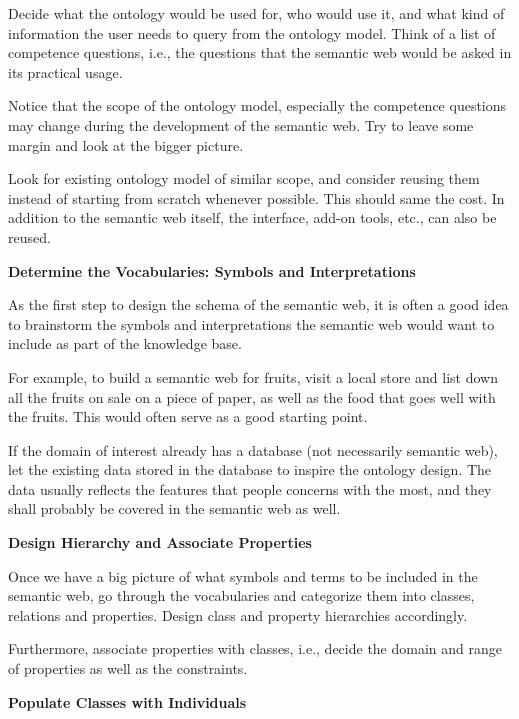 Decide what the ontology would be used for, who would use it, and what kind of information the user needs to query from the ontology model. Think of a list of competence questions, i.e., the questions that the semantic web would be asked in its practical usage.

Notice that the scope of the ontology model, especially the competence questions may change during the development of the semantic web. Try to leave some margin and look at the bigger picture.

Look for existing ontology model of similar scope, and consider reusing them instead of starting from scratch whenever possible. This should same the cost. In addition to the semantic web itself, the interface, add-on tools, etc., can also be reused.

\vspace{0.1in}
\noindent \textbf{Determine the Vocabularies: Symbols and Interpretations}
\vspace{0.1in}

As the first step to design the schema of the semantic web, it is often a good idea to brainstorm the symbols and interpretations the semantic web would want to include as part of the knowledge base.

For example, to build a semantic web for fruits, visit a local store and list down all the fruits on sale on a piece of paper, as well as the food that goes well with the fruits. This would often serve as a good starting point.

If the domain of interest already has a database (not necessarily semantic web), let the existing data stored in the database to inspire the ontology design. The data usually reflects the features that people concerns with the most, and they shall probably be covered in the semantic web as well.

\vspace{0.1in}
\noindent \textbf{Design Hierarchy and Associate Properties}
\vspace{0.1in}

Once we have a big picture of what symbols and terms to be included in the semantic web, go through the vocabularies and categorize them into classes, relations and properties. Design class and property hierarchies accordingly. 

Furthermore, associate properties with classes, i.e., decide the domain and range of properties as well as the constraints.

\vspace{0.1in}
\noindent \textbf{Populate Classes with Individuals}
\vspace{0.1in}

